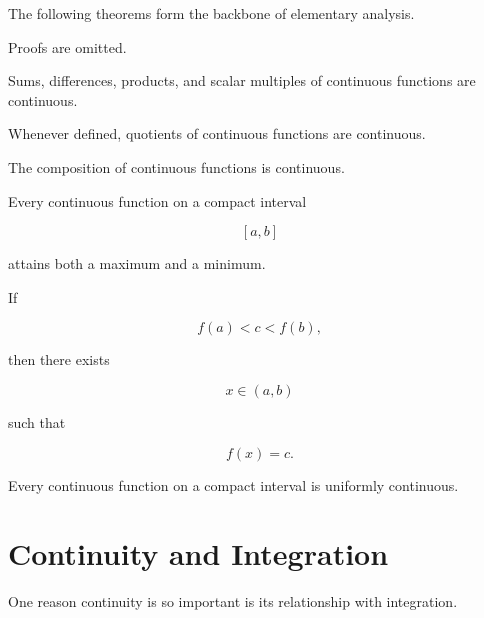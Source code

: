\documentclass{essay}
\begin{document}
The following theorems form the backbone of elementary analysis.

Proofs are omitted.

\begin{theorem}

Sums, differences, products, and scalar multiples of continuous functions are
continuous.

Whenever defined, quotients of continuous functions are continuous.

\end{theorem}

\begin{theorem}[Composition]

The composition of continuous functions is continuous.

\end{theorem}

\begin{theorem}

Every continuous function on a compact interval

\[
[a,b]
\]

attains both a maximum and a minimum.

\end{theorem}

\begin{theorem}

If

\[
f(a)<c<f(b),
\]

then there exists

\[
x\in(a,b)
\]

such that

\[
f(x)=c.
\]

\end{theorem}

\begin{theorem}

Every continuous function on a compact interval is uniformly continuous.

\end{theorem}


\section{Continuity and Integration}

One reason continuity is so important is its relationship with integration.
\end{document}

